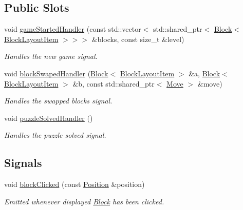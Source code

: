 \subsection*{Public Slots}
\begin{DoxyCompactItemize}
\item 
void \mbox{\hyperlink{class_blocks_view_a23c0b8242274f9627a91dba5fa8af036}{game\+Started\+Handler}} (const std\+::vector$<$ std\+::shared\+\_\+ptr$<$ \mbox{\hyperlink{class_block}{Block}}$<$ \mbox{\hyperlink{class_block_layout_item}{Block\+Layout\+Item}} $>$$>$$>$ \&blocks, const size\+\_\+t \&level)
\begin{DoxyCompactList}\small\item\em Handles the new game signal. \end{DoxyCompactList}\item 
void \mbox{\hyperlink{class_blocks_view_ad7f8487f26dd09d0058e8774f5f443b4}{block\+Swaped\+Handler}} (\mbox{\hyperlink{class_block}{Block}}$<$ \mbox{\hyperlink{class_block_layout_item}{Block\+Layout\+Item}} $>$ \&a, \mbox{\hyperlink{class_block}{Block}}$<$ \mbox{\hyperlink{class_block_layout_item}{Block\+Layout\+Item}} $>$ \&b, const std\+::shared\+\_\+ptr$<$ \mbox{\hyperlink{struct_move}{Move}} $>$ \&move)
\begin{DoxyCompactList}\small\item\em Handles the swapped blocks signal. \end{DoxyCompactList}\item 
void \mbox{\hyperlink{class_blocks_view_aac769b83129ef5e37c4ab6c680cc13a1}{puzzle\+Solved\+Handler}} ()
\begin{DoxyCompactList}\small\item\em Handles the puzzle solved signal. \end{DoxyCompactList}\end{DoxyCompactItemize}
\subsection*{Signals}
\begin{DoxyCompactItemize}
\item 
void \mbox{\hyperlink{class_blocks_view_ace9e48402539d2e3945ce794d7ae7dd9}{block\+Clicked}} (const \mbox{\hyperlink{struct_position}{Position}} \&position)
\begin{DoxyCompactList}\small\item\em Emitted whenever displayed \mbox{\hyperlink{class_block}{Block}} has been clicked. \end{DoxyCompactList}\end{DoxyCompactItemize}
